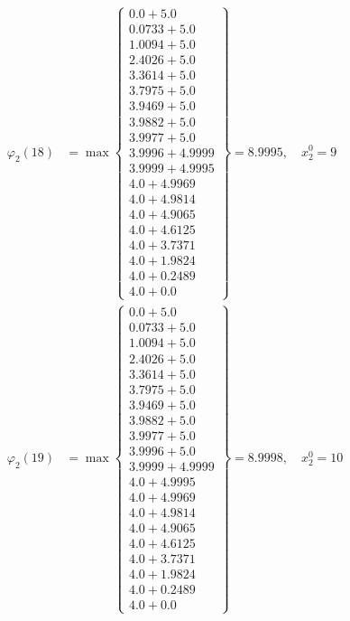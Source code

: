 \documentclass{article}
\begin{document}
\begin{align*}
\varphi_{2}(18) &= \max \left\{ \begin{array}{c}
0.0 + 5.0 \\
 0.0733 + 5.0 \\
 1.0094 + 5.0 \\
 2.4026 + 5.0 \\
 3.3614 + 5.0 \\
 3.7975 + 5.0 \\
 3.9469 + 5.0 \\
 3.9882 + 5.0 \\
 3.9977 + 5.0 \\
 3.9996 + 4.9999 \\
 3.9999 + 4.9995 \\
 4.0 + 4.9969 \\
 4.0 + 4.9814 \\
 4.0 + 4.9065 \\
 4.0 + 4.6125 \\
 4.0 + 3.7371 \\
 4.0 + 1.9824 \\
 4.0 + 0.2489 \\
 4.0 + 0.0
\end{array} \right\}=8.9995, \quad x_{2}^0=9\\
  
\varphi_{2}(19) &= \max \left\{ \begin{array}{c}
0.0 + 5.0 \\
 0.0733 + 5.0 \\
 1.0094 + 5.0 \\
 2.4026 + 5.0 \\
 3.3614 + 5.0 \\
 3.7975 + 5.0 \\
 3.9469 + 5.0 \\
 3.9882 + 5.0 \\
 3.9977 + 5.0 \\
 3.9996 + 5.0 \\
 3.9999 + 4.9999 \\
 4.0 + 4.9995 \\
 4.0 + 4.9969 \\
 4.0 + 4.9814 \\
 4.0 + 4.9065 \\
 4.0 + 4.6125 \\
 4.0 + 3.7371 \\
 4.0 + 1.9824 \\
 4.0 + 0.2489 \\
 4.0 + 0.0
\end{array} \right\}=8.9998, \quad x_{2}^0=10\\
  

\end{align*}
\end{document}
